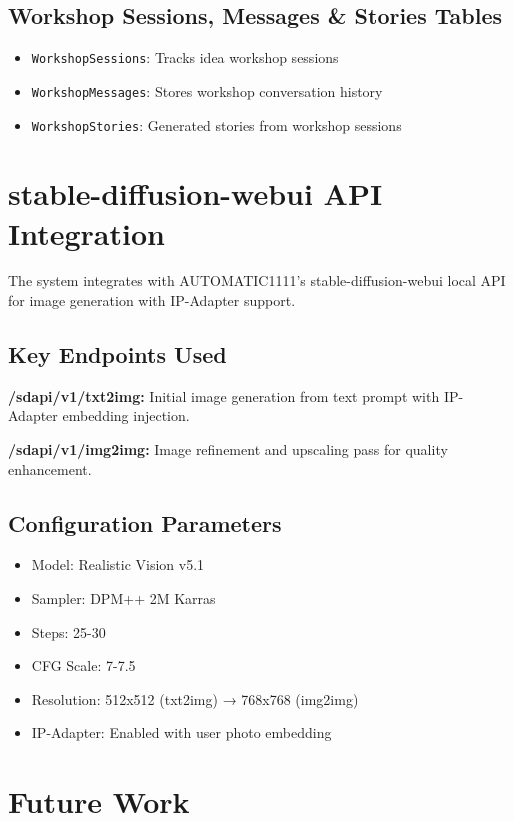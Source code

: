 \subsection{Workshop Sessions, Messages \& Stories Tables}
\begin{itemize}
    \item \texttt{WorkshopSessions}: Tracks idea workshop sessions
    \item \texttt{WorkshopMessages}: Stores workshop conversation history
    \item \texttt{WorkshopStories}: Generated stories from workshop sessions
\end{itemize}

\section{stable-diffusion-webui API Integration}

The system integrates with AUTOMATIC1111's stable-diffusion-webui local API for image generation with IP-Adapter support.

\subsection{Key Endpoints Used}

\textbf{/sdapi/v1/txt2img:} Initial image generation from text prompt with IP-Adapter embedding injection.

\textbf{/sdapi/v1/img2img:} Image refinement and upscaling pass for quality enhancement.

\subsection{Configuration Parameters}
\begin{itemize}
    \item Model: Realistic Vision v5.1
    \item Sampler: DPM++ 2M Karras
    \item Steps: 25-30
    \item CFG Scale: 7-7.5
    \item Resolution: 512x512 (txt2img) → 768x768 (img2img)
    \item IP-Adapter: Enabled with user photo embedding
\end{itemize}

\section{Future Work}

